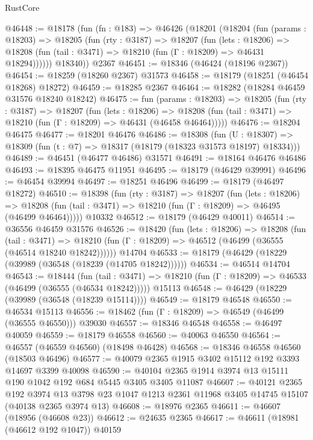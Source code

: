 \begin{lexlean}{RustCore}
\begin{coremodule}
@46448 := @18178
    (fun (fn : @183) =>
    @46426
      (@18201
        (@18204
          (fun (params : @18203) =>
          @18205
            (fun (rty : @3187) =>
            @18207
              (fun (lets : @18206) =>
              @18208 (fun (tail : @3471) => @18210 (fun (Γ : @18209) => @46431 @18294))))))
        @18340))
    @2367
@46451 := @18346 (@46424 (@18196 @2367))
@46454 := @18259 (@18260 @2367) @31573
@46458 := @18179 (@18251 (@46454 @18268) @18272)
@46459 := @18285 @2367
@46464 := @18282 (@18284 @46459 @31576 @18240 @18242)
@46475 := fun (params : @18203) =>
  @18205
    (fun (rty : @3187) =>
    @18207
      (fun (lets : @18206) =>
      @18208 (fun (tail : @3471) => @18210 (fun (Γ : @18209) => @46431 (@46458 @46464)))))
@46476 := @18204 @46475
@46477 := @18201 @46476
@46486 := @18308
    (fun (U : @18307) => @18309 (fun (t : @7) => @18317 (@18179 (@18323 @31573 @18197) @18334)))
@46489 := @46451 (@46477 @46486) @31571
@46491 := @18164 @46476 @46486
@46493 := @18395 @46475 @11951
@46495 := @18179 (@46429 @39991)
@46496 := @46454 @39994
@46497 := @18251 @46496
@46499 := @18179 (@46497 @18272)
@46510 := @18398
    (fun (rty : @3187) =>
    @18207
      (fun (lets : @18206) =>
      @18208 (fun (tail : @3471) => @18210 (fun (Γ : @18209) => @46495 (@46499 @46464)))))
    @10332
@46512 := @18179 (@46429 @40011)
@46514 := @36556 @46459 @31576
@46526 := @18420
    (fun (lets : @18206) =>
    @18208
      (fun (tail : @3471) =>
      @18210 (fun (Γ : @18209) => @46512 (@46499 (@36555 (@46514 @18240 @18242))))))
    @14704
@46533 := @18179 (@46429 (@18229 (@39989 (@36548 (@18239 (@14705 @18242))))))
@46534 := @46514 @14704
@46543 := @18444
    (fun (tail : @3471) => @18210 (fun (Γ : @18209) => @46533 (@46499 (@36555 (@46534 @18242)))))
    @15113
@46548 := @46429 (@18229 (@39989 (@36548 (@18239 @15114))))
@46549 := @18179 @46548
@46550 := @46534 @15113
@46556 := @18462 (fun (Γ : @18209) => @46549 (@46499 (@36555 @46550))) @39030
@46557 := @18346 @46548
@46558 := @46497 @40059
@46559 := @18179 @46558
@46560 := @40063 @46550
@46564 := @46557 (@46559 @46560) (@18498 @46428)
@46568 := @18346 @46558 @46560 (@18503 @46496)
@46577 := @40079 @2365 @1915 @3402 @15112 @192 @3393 @14697 @3399 @40098
@46590 := @40104 @2365 @1914 @3974 @13 @15111 @190 @1042 @192 @684 @5445 @3405 @3405 @11087
@46607 := @40121
    @2365
    @192
    @3974
    @13
    @3798
    @23
    @1047
    @1213
    @2361
    @11968
    @3405
    @14745
    @15107
    (@40138 @2365 @3974 @13)
@46608 := @18976 @2365
@46611 := @46607 (@18956 (@46608 @23))
@46612 := @24635 @2365
@46617 := @46611 (@18981 (@46612 @192 @1047)) @40159

\end{coremodule}
\end{lexlean}
